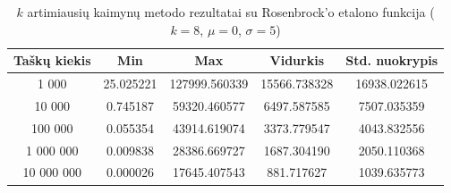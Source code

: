 \begin{table}[H]
    \centering
    \begin{tabular}{|c|c|c|c|c|}
        \hline
        \textbf{Taškų kiekis} & \textbf{Min} & \textbf{Max} & \textbf{Vidurkis} & \textbf{Std. nuokrypis} \\ \hline
        1 000        & 25.025221 & 127999.560339 & 15566.738328 & 16938.022615 \\ \hline
        10 000       & 0.745187 & 59320.460577 & 6497.587585 & 7507.035359 \\ \hline
        100 000      & 0.055354 & 43914.619074 & 3373.779547 & 4043.832556 \\ \hline
        1 000 000    & 0.009838 & 28386.669727 & 1687.304190 & 2050.110368 \\ \hline
        10 000 000   & 0.000026 & 17645.407543 & 881.717627 & 1039.635773 \\ \hline
    \end{tabular}
    \caption{$k$ artimiausių kaimynų metodo rezultatai su Rosenbrock'o etalono funkcija ($k = 8$, $\mu = 0$, $\sigma = 5$)}
\end{table}